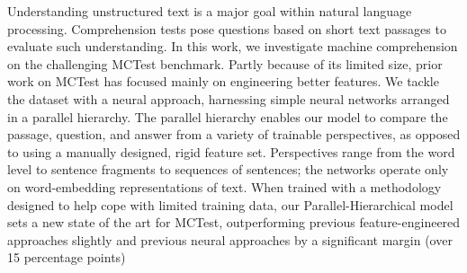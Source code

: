 Understanding unstructured text is a major goal within natural language processing. Comprehension tests pose questions based on short text passages to evaluate such understanding. In this work, we investigate machine comprehension on the challenging MCTest benchmark. Partly because of its limited size, prior work on MCTest has focused mainly on engineering better features. We tackle the dataset with a neural approach, harnessing simple neural networks arranged in a parallel hierarchy. The parallel hierarchy enables our model to compare the passage, question, and answer from a variety of trainable perspectives, as opposed to using a manually designed, rigid feature set. Perspectives range from the word level to sentence fragments to sequences of sentences; the networks operate only on word-embedding representations of text. When trained with a methodology designed to help cope with limited training data, our Parallel-Hierarchical model sets a new state of the art for MCTest, outperforming previous feature-engineered approaches slightly and previous neural approaches by a significant margin (over 15 percentage points)
